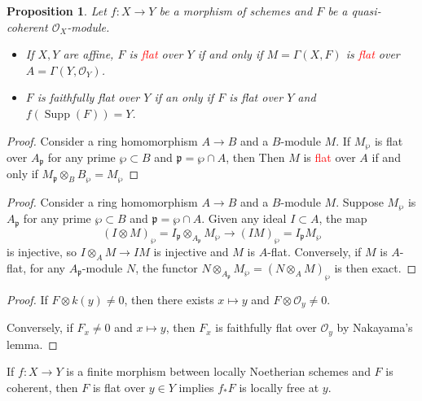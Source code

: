 \documentclass[leqno]{amsart}
\DeclareMathOperator{\Supp}{Supp}
\newcommand{\1}{\mathbf{1}}
\newcommand{\fp}{\mathfrak p}
\newtheorem{prop}[thm]{Proposition}
\theoremstyle{definition}
\theoremstyle{remark}
\newcommand{\red}[1]{\textcolor{Red}{#1}}
\begin{document}
\begin{prop}
	Let $f\colon X\to Y$ be a morphism of schemes
	and  $F$ be a quasi-coherent $\mathcal{O}_X$-module.
	\begin{itemize}
		\item If $X,Y$ are affine,
		$F$ is \red{flat} over $Y$ if and only if
		$M=\Gamma(X,F)$ is \red{flat}
		over $A=\Gamma(Y,\mathcal{O}_Y)$.
		\item $F$ is faithfully flat over $Y$
		if an only if $F$ is flat over $Y$
		and $f(\Supp(F))=Y$.
	\end{itemize}
\end{prop}
\begin{proof}
	Consider a ring homomorphism $A\to B$
	and a $B$-module $M$. 
	If $M_\wp$ is flat over $A_\fp$ 
	for any prime $\wp\subset B$ and  $\fp=\wp\cap A$,
	then 
	Then $M$ is \red{flat} over $A$ if and only if 
	$M_\fp\otimes_BB_\wp=M_\wp$
\end{proof}
\begin{proof}
    Consider a ring homomorphism $A\to B$ and a $B$-module $M$.
    Suppose $M_\wp$ is $A_\fp$ for any prime $\wp\subset B$
    and $\fp=\wp\cap A$. Given any ideal $I\subset A$, the map
    \[
        (I\otimes M)_\wp=I_\fp\otimes_{A_\fp}M_\wp \to (IM)_\wp=I_{\fp}M_\wp
    \]
    is injective, so $I\otimes_AM\to IM$ is injective and $M$ is $A$-flat.
    Conversely, if $M$ is $A$-flat, for any $A_\fp$-module $N$, the functor
    $N\otimes_{A_\fp}M_\wp=(N\otimes_AM)_\wp$ is then exact.
\end{proof}
\begin{proof}
    If $F\otimes k(y)\neq 0$, then there exists $x\mapsto y$
    and $F\otimes \mathcal{O}_y\neq 0$.

    Conversely, if $F_x\neq 0$ and $x\mapsto y$,
    then $F_x$ is faithfully flat over $\mathcal{O}_y$ 
    by Nakayama's lemma.
\end{proof}



If $f\colon X\to Y$ is a finite morphism between locally Noetherian schemes
and $F$ is coherent,
then $F$ is flat over $y\in Y$ implies $f_*F$ is locally free at $y$.
\end{document}
